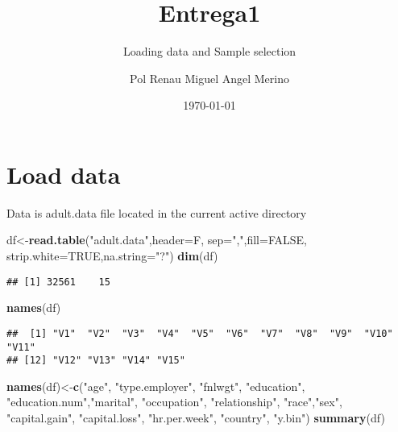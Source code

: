 \documentclass[12pt,]{article}
\title{Entrega1}
\subtitle{Loading data and Sample selection}
\author{Pol Renau Miguel Angel Merino}
\date{\today}
\newenvironment{Shaded}{\begin{snugshade}}{\end{snugshade}}
\newcommand{\DataTypeTok}[1]{\textcolor[rgb]{0.13,0.29,0.53}{#1}}
\newcommand{\KeywordTok}[1]{\textcolor[rgb]{0.13,0.29,0.53}{\textbf{#1}}}
\newcommand{\NormalTok}[1]{#1}
\newcommand{\OtherTok}[1]{\textcolor[rgb]{0.56,0.35,0.01}{#1}}
\newcommand{\StringTok}[1]{\textcolor[rgb]{0.31,0.60,0.02}{#1}}
\begin{document}
\maketitle

{
\setcounter{tocdepth}{4}
\tableofcontents
}
\hypertarget{load-data}{%
\section{Load data}\label{load-data}}

Data is adult.data file located in the current active directory

\begin{Shaded}
\begin{Highlighting}[]
\NormalTok{df<-}\KeywordTok{read.table}\NormalTok{(}\StringTok{"adult.data"}\NormalTok{,}\DataTypeTok{header=}\NormalTok{F, }\DataTypeTok{sep=}\StringTok{","}\NormalTok{,}\DataTypeTok{fill=}\OtherTok{FALSE}\NormalTok{,              }\DataTypeTok{strip.white=}\OtherTok{TRUE}\NormalTok{,}\DataTypeTok{na.string=}\StringTok{"?"}\NormalTok{)}
\KeywordTok{dim}\NormalTok{(df)}
\end{Highlighting}
\end{Shaded}

\begin{verbatim}
## [1] 32561    15
\end{verbatim}

\begin{Shaded}
\begin{Highlighting}[]
\KeywordTok{names}\NormalTok{(df)}
\end{Highlighting}
\end{Shaded}

\begin{verbatim}
##  [1] "V1"  "V2"  "V3"  "V4"  "V5"  "V6"  "V7"  "V8"  "V9"  "V10" "V11"
## [12] "V12" "V13" "V14" "V15"
\end{verbatim}

\begin{Shaded}
\begin{Highlighting}[]
\KeywordTok{names}\NormalTok{(df)<-}\KeywordTok{c}\NormalTok{(}\StringTok{"age"}\NormalTok{, }\StringTok{"type.employer"}\NormalTok{, }\StringTok{"fnlwgt"}\NormalTok{, }\StringTok{"education"}\NormalTok{, }\StringTok{"education.num"}\NormalTok{,}\StringTok{"marital"}\NormalTok{, }\StringTok{"occupation"}\NormalTok{, }
             \StringTok{"relationship"}\NormalTok{, }\StringTok{"race"}\NormalTok{,}\StringTok{"sex"}\NormalTok{, }\StringTok{"capital.gain"}\NormalTok{, }\StringTok{"capital.loss"}\NormalTok{, }
             \StringTok{"hr.per.week"}\NormalTok{, }\StringTok{"country"}\NormalTok{, }\StringTok{"y.bin"}\NormalTok{)}
\KeywordTok{summary}\NormalTok{(df)}
\end{Highlighting}
\end{Shaded}
\end{document}
